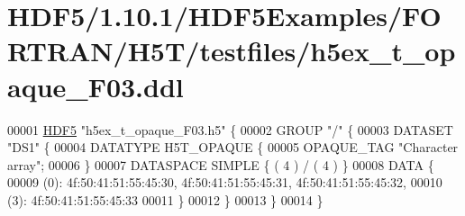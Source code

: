 \hypertarget{_h_d_f5_21_810_81_2_h_d_f5_examples_2_f_o_r_t_r_a_n_2_h5_t_2testfiles_2h5ex__t__opaque___f03_8ddl_source}{}\section{H\+D\+F5/1.10.1/\+H\+D\+F5\+Examples/\+F\+O\+R\+T\+R\+A\+N/\+H5\+T/testfiles/h5ex\+\_\+t\+\_\+opaque\+\_\+\+F03.ddl}
\label{_h_d_f5_21_810_81_2_h_d_f5_examples_2_f_o_r_t_r_a_n_2_h5_t_2testfiles_2h5ex__t__opaque___f03_8ddl_source}

\begin{DoxyCode}
00001 \hyperlink{namespace_h_d_f5}{HDF5} \textcolor{stringliteral}{"h5ex\_t\_opaque\_F03.h5"} \{
00002 GROUP \textcolor{stringliteral}{"/"} \{
00003    DATASET \textcolor{stringliteral}{"DS1"} \{
00004       DATATYPE  H5T\_OPAQUE \{
00005          OPAQUE\_TAG \textcolor{stringliteral}{"Character array"};
00006       \}
00007       DATASPACE  SIMPLE \{ ( 4 ) / ( 4 ) \}
00008       DATA \{
00009       (0): 4f:50:41:51:55:45:30, 4f:50:41:51:55:45:31, 4f:50:41:51:55:45:32,
00010       (3): 4f:50:41:51:55:45:33
00011       \}
00012    \}
00013 \}
00014 \}
\end{DoxyCode}
